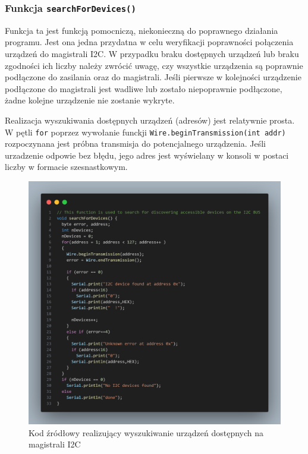 \documentclass{report}
\begin{document}
\subsubsection*{Funkcja \texttt{searchForDevices()}}

Funkcja ta jest funkcją pomocniczą, niekonieczną do poprawnego działania programu. Jest ona jedna przydatna w celu weryfikacji poprawności połączenia urządzeń do magistrali I2C. W przypadku braku dostępnych urządzeń lub braku zgodności ich liczby należy zwrócić uwagę, czy wszystkie urządzenia są poprawnie podłączone do zasilania oraz do magistrali. Jeśli pierwsze w kolejności urządzenie podłączone do magistrali jest wadliwe lub zostało niepoprawnie podłączone, żadne kolejne urządzenie nie zostanie wykryte. 


Realizacja wyszukiwania dostępnych urządzeń (adresów) jest relatywnie prosta. W pętli \texttt{for} poprzez wywołanie funckji \texttt{Wire.beginTransmission(int addr)} rozpoczynana jest próbna transmisja do potencjalnego urządzenia. Jeśli urzadzenie odpowie bez błędu, jego adres jest wyświelany w konsoli w postaci liczby w formacie szesnastkowym.
\begin{figure}[H]
    \centering
    \includegraphics[width=1.0\textwidth]{src/code_snaps/searchDevices.png}
    \caption{Kod źródłowy realizujący wyszukiwanie urządzeń dostępnych na magistrali I2C}
\end{figure}
\end{document}

